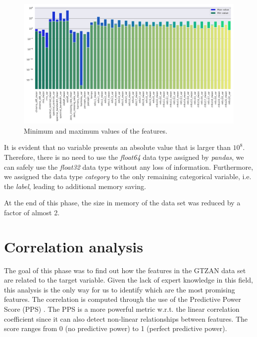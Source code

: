 \documentclass{Configuration_Files/PoliMi3i_thesis}
\begin{document}
\begin{figure}[H]
    \centering
    \includegraphics[width=\textwidth]{Figures/datatypes.png}
    \caption{Minimum and maximum values of the features.}
    \label{fig:datatypes}
\end{figure}

It is evident that no variable presents an absolute value that is larger than $10^8$. Therefore, there is no need to use the \textit{float64} data type assigned by \textit{pandas}, we can safely use the \textit{float32} data type without any loss of information. Furthermore, we assigned the data type \textit{category} to the only remaining categorical variable, i.e. the \textit{label}, leading to additional memory saving. 

At the end of this phase, the size in memory of the data set was reduced by a factor of almost 2.

\section{Correlation analysis}
\label{sec:corr}%
The goal of this phase was to find out how the features in the GTZAN data set are related to the target variable. Given the lack of expert knowledge in this field, this analysis is the only way for us to identify which are the most promising features. The correlation is computed through the use of the Predictive Power Score (PPS) \cite{pps}. The PPS is a more powerful metric w.r.t. the linear correlation coefficient since it can also detect non-linear relationships between features. The score ranges from 0 (no predictive power) to 1 (perfect predictive power).
\end{document}
